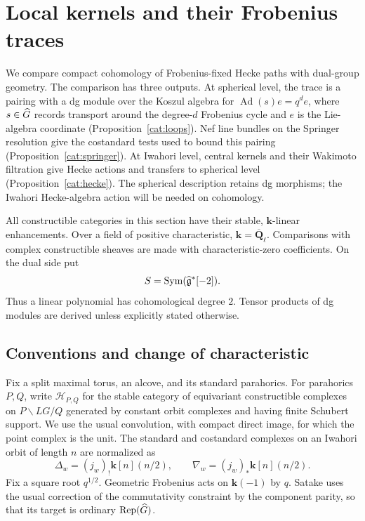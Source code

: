 \section{Local kernels and their Frobenius traces}\label{sec:categorical}

We compare compact cohomology of Frobenius-fixed Hecke paths with
dual-group geometry. The comparison has three outputs. At spherical
level, the trace is a pairing with a dg module over the Koszul algebra
for $\operatorname{Ad}(s)e=q^d e$, where $s\in\widehat G$ records transport
around the degree-$d$ Frobenius cycle and $e$ is the Lie-algebra
coordinate (Proposition~\ref{cat:loops}). Nef line bundles on the
Springer resolution give the costandard tests used to bound this
pairing (Proposition~\ref{cat:springer}). At Iwahori level, central
kernels and their Wakimoto filtration give Hecke actions and transfers
to spherical level (Proposition~\ref{cat:hecke}). The spherical
description retains dg morphisms; the Iwahori Hecke-algebra action
will be needed on cohomology.

All constructible
categories in this section have their stable, $\mathbf k$-linear enhancements.
Over a field of positive characteristic, $\mathbf k=\overline{\mathbf Q}_\ell$.
Comparisons with complex constructible sheaves are made with characteristic-zero
coefficients. On the dual side put
\[
 S=\operatorname{Sym}(\widehat{\mathfrak g}^*[-2]).
\]
Thus a linear polynomial has cohomological degree $2$. Tensor products of
dg modules are derived unless explicitly stated otherwise.

\subsection{Conventions and change of characteristic}

Fix a split maximal torus, an alcove, and its standard parahorics. For
parahorics $P,Q$, write $\mathscr H_{P,Q}$ for the stable category of
equivariant constructible complexes on $P\backslash LG/Q$ generated by
constant orbit complexes and having finite Schubert support. We use the
usual convolution, with compact direct image, for which the point complex
is the unit. The standard and costandard complexes on an Iwahori orbit
of length $n$ are normalized as
\[
 \Delta_w=(j_w)_!\mathbf k[n](n/2),\qquad
 \nabla_w=(j_w)_*\mathbf k[n](n/2).
\]
Fix a square root $q^{1/2}$. Geometric Frobenius acts on
$\mathbf k(-1)$ by $q$. Satake uses the usual correction of the
commutativity constraint by the component parity, so that its target is
ordinary $\operatorname{Rep}(\widehat G)$.

